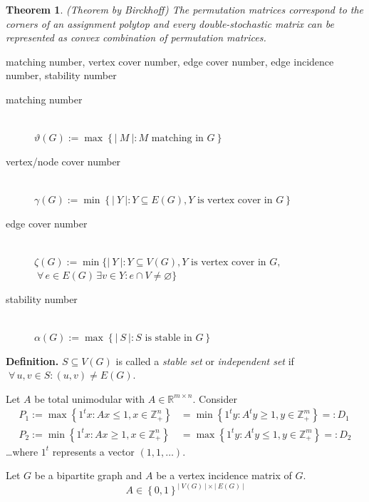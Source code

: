 \documentclass{article}
\newtheorem{theorem}{Theorem}
\newcommand{\card}[1]{\left|\:\!#1\:\!\right|}
\newcommand{\set}[1]{\left\{#1\right\}}
\newcommand{\fall}{\;\forall\,}
\begin{document}
\begin{theorem}
  (Theorem by Birckhoff)
  The permutation matrices correspond to the corners of an assignment polytop and every double-stochastic matrix can be represented as convex combination of permutation matrices.
\end{theorem}

matching number, vertex cover number, edge cover number, edge incidence number, stability number

\begin{description}
  \item[matching number]\hfill{} \\
    $\vartheta(G) := \max\set{\card{M}: M \text{ matching in } G}$
  \item[vertex/node cover number]\hfill{} \\
    $\gamma(G) := \min\set{\card{Y}: Y \subseteq E(G), Y \text{ is vertex cover in } G}$
  \item[edge cover number]\hfill{} \\
    $\zeta(G) := \min\{\card{Y}: Y \subseteq V(G), Y \text{ is vertex cover in } G, $ \\
    $\fall e \in E(G) \,\exists v \in Y: e \cap V \neq \diameter\}$
  \item[stability number]\hfill{} \\
    $\alpha(G) := \max\set{\card{S}: S \text{ is stable in } G}$
\end{description}

\textbf{Definition.}
  $S \subseteq V(G)$ is called a \emph{stable set} or \emph{independent set} if $\fall u,v \in S: (u,v) \neq E(G)$.

Let $A$ be total unimodular with $A \in \mathbb{R}^{m \times n}$.
Consider \begin{align*}
  P_1 := \max\set{
    1^t x:
    Ax \leq 1, x \in \mathbb{Z}_+^n
  } &= \min\set{
    1^t y: A^t y \geq 1, y \in \mathbb{Z}_+^m
  } =: D_1 \\
  P_2 := \min\set{
    1^t x: Ax \geq 1, x \in \mathbb{Z}_+^n
  } &= \max\set{
    1^t y: A^t y \leq 1, y \in \mathbb{Z}_+^m
  } =: D_2
\end{align*}
\dots where $1^t$ represents a vector $(1,1,\ldots)$.

Let $G$ be a bipartite graph and $A$ be a vertex incidence matrix of $G$.
\[
  A \in \set{0,1}^{\card{V(G)} \times \card{E(G)}}
\]
\end{document}
